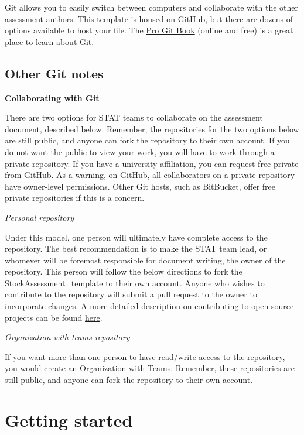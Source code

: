 \documentclass[12pt,]{article}
\begin{document}
Git allows you to easily switch between computers and collaborate with
the other assessment authors. This template is housed on
\href{https://github.com/}{GitHub}, but there are dozens of options
available to host your file. The
\href{http://git-scm.com/book/en/v2}{Pro Git Book} (online and free) is
a great place to learn about Git.

\subsection{Other Git notes}\label{other-git-notes}

\textbf{Collaborating with Git}

There are two options for STAT teams to collaborate on the assessment
document, described below. Remember, the repositories for the two
options below are still public, and anyone can fork the repository to
their own account. If you do not want the public to view your work, you
will have to work through a private repository. If you have a university
affiliation, you can request free private from GitHub. As a warning, on
GitHub, all collaborators on a private repository have owner-level
permissions. Other Git hosts, such as BitBucket, offer free private
repositories if this is a concern.

\emph{Personal repository}

Under this model, one person will ultimately have complete access to the
repository. The best recommendation is to make the STAT team lead, or
whomever will be foremost responsible for document writing, the owner of
the repository. This person will follow the below directions to fork the
StockAssessment\_template to their own account. Anyone who wishes to
contribute to the repository will submit a pull request to the owner to
incorporate changes. A more detailed description on contributing to open
source projects can be found
\href{https://guides.github.com/activities/contributing-to-open-source/}{here}.

\emph{Organization with teams repository}

If you want more than one person to have read/write access to the
repository, you would create an
\href{https://help.github.com/articles/creating-a-new-organization-account/}{Organization}
with
\href{https://help.github.com/articles/permission-levels-for-an-organization-repository/}{Teams}.
Remember, these repositories are still public, and anyone can fork the
repository to their own account.

\section{Getting started}\label{getting-started}
\end{document}
